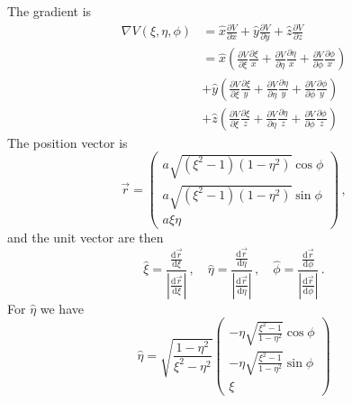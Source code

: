 \documentclass[a4paper,10pt]{article}
\numberwithin{equation}{section}
\newcommand{\ud}{\mathrm{d}}
\begin{document}
  The gradient is
  \begin{equation}\begin{split}
   \nabla V(\xi, \eta, \phi) &= \hat{x} \frac{\partial V}{\partial x} + \hat{y} \frac{\partial V}{\partial y} + \hat{z} \frac{\partial V}{\partial z} \\
                             &= \hat{x} \left( \frac{\partial V}{\partial \xi} \frac{\partial \xi}{x}
                                + \frac{\partial V}{\partial \eta} \frac{\partial \eta}{x}
                                + \frac{\partial V}{\partial \phi} \frac{\partial \phi}{x} \right) \\
                             &+ \hat{y} \left( \frac{\partial V}{\partial \xi} \frac{\partial \xi}{y}
                                + \frac{\partial V}{\partial \eta} \frac{\partial \eta}{y}
                                + \frac{\partial V}{\partial \phi} \frac{\partial \phi}{y} \right) \\
                             &+ \hat{z} \left( \frac{\partial V}{\partial \xi} \frac{\partial \xi}{z}
                                + \frac{\partial V}{\partial \eta} \frac{\partial \eta}{z}
                                + \frac{\partial V}{\partial \phi} \frac{\partial \phi}{z} \right)
  \end{split}\end{equation}
  The position vector is
  \begin{equation}
   \vec{r} = \begin{pmatrix}
               a \sqrt{(\xi^2-1)(1-\eta^2)}\cos{\phi}\\
               a \sqrt{(\xi^2-1)(1-\eta^2)}\sin{\phi}\\
               a\xi\eta
             \end{pmatrix}\, ,
  \end{equation}
  and the unit vector are then
  \begin{equation}
    \hat{\xi} = \frac{\frac{\ud \vec{r}}{\ud \xi}}{\left|\frac{\ud \vec{r}}{\ud \xi}\right|}\,, \quad
    \hat{\eta} = \frac{\frac{\ud \vec{r}}{\ud \eta}}{\left|\frac{\ud \vec{r}}{\ud \eta}\right|}\,, \quad
    \hat{\phi} = \frac{\frac{\ud \vec{r}}{\ud \phi}}{\left|\frac{\ud \vec{r}}{\ud \phi}\right|}\, .
  \end{equation}
  For \(\hat{\eta}\) we have
  \begin{equation}
   \hat{\eta} = \sqrt{\frac{1-\eta^2}{\xi^2-\eta^2}}
     \begin{pmatrix}
       -\eta \sqrt{\frac{\xi^2-1}{1-\eta^2}} \cos{\phi}\\
       -\eta \sqrt{\frac{\xi^2-1}{1-\eta^2}} \sin{\phi}\\
       \xi
     \end{pmatrix}
  \end{equation}
\end{document}
